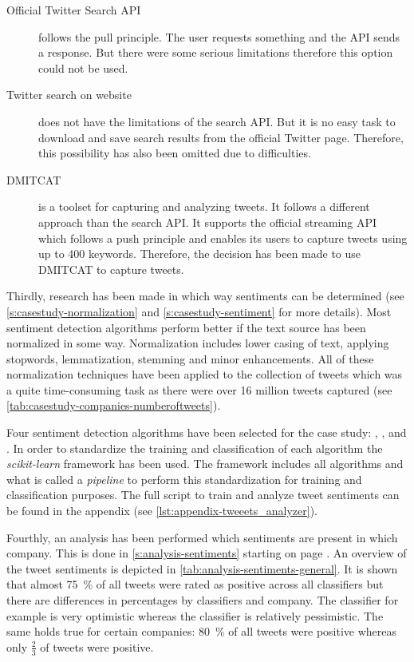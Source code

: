\begin{description}
    \item[Official Twitter Search \ac{API}]
        follows the pull principle. 
        The user requests something and the \ac{API} sends a response.
        But there were some serious limitations therefore this option could not be used.

    \item[Twitter search on website]
        does not have the limitations of the search \ac{API}.
        But it is no easy task to download and save search results from the official Twitter page.
        Therefore, this possibility has also been omitted due to difficulties.    
    
    \item[\ac{DMITCAT}] 
        is a toolset for capturing and analyzing tweets.
        It follows a different approach than the search \ac{API}.
        It supports the official streaming \ac{API} which follows a push principle and enables its users to capture tweets using up to 400 keywords.
        Therefore, the decision has been made to use \ac{DMITCAT} to capture tweets.

\end{description}

Thirdly, research has been made in which way sentiments can be determined (see \cref{s:casestudy-normalization} and \cref{s:casestudy-sentiment} for more details).
Most sentiment detection algorithms perform better if the text source has been normalized in some way.
Normalization includes lower casing of text, applying stopwords, lemmatization, stemming and minor enhancements.
All of these normalization techniques have been applied to the collection of tweets which was a quite time-consuming task as there were over 16 million tweets captured (see \cref{tab:casestudy-companies-numberoftweets}).

Four sentiment detection algorithms have been selected for the case study: \tb{}, \nb{}, \me{} and \svm{}.
In order to standardize the training and classification of each algorithm the \emph{scikit-learn} framework has been used.
The framework includes all algorithms and what is called a \emph{pipeline} to perform this standardization for training and classification purposes.
The full script to train and analyze tweet sentiments can be found in the appendix (see \cref{lst:appendix-tweeets_analyzer}).

Fourthly, an analysis has been performed which sentiments are present in which company.
This is done in \cref{s:analysis-sentiments} starting on page \pageref{s:analysis-sentiments}.
An overview of the tweet sentiments is depicted in \cref{tab:analysis-sentiments-general}.
It is shown that almost \SI{75}{\percent} of all tweets were rated as positive across all classifiers but there are differences in percentages by classifiers and company.
The \tb{} classifier for example is very optimistic whereas the \nb{} classifier is relatively pessimistic.
The same holds true for certain companies: \SI{80}{\percent} of all \gm{} tweets were positive whereas only $\frac{2}{3}$ of \vw{} tweets were positive.

